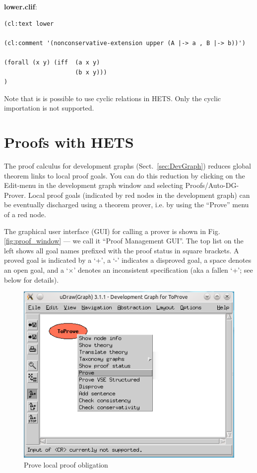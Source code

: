 \documentclass{article}
\newcommand{\normalTEXTSC}[2]{{#1\scriptsize#2}}
\newcommand     {\Hets}{\normalTEXTSC{H}{ETS}\xspace}
\begin{document}
\textbf{lower.clif}:
\begin{lstlisting}[language=clif]
(cl:text lower

(cl:comment '(nonconservative-extension upper (A |-> a , B |-> b))')

(forall (x y) (iff  (a x y)
                    (b x y)))
)
\end{lstlisting}

Note that is is possible to use cyclic relations in \Hets. Only the cyclic 
importation is not supported.



\section{Proofs with \Hets}\label{sec:Proofs}

The proof calculus for development graphs (Sect.~\ref{sec:DevGraph}) reduces
global theorem links to local proof goals. You can do this reduction by clicking 
on the Edit-menu in the development graph window and selecting 
Proofs/Auto-DG-Prover. Local proof goals (indicated by red
nodes in the development graph) can be eventually discharged using a theorem
prover, i.e. by using the ``Prove'' menu of a red node.

The graphical user interface (GUI) for calling a prover is shown in
Fig. \ref{fig:proof_window} --- we call it ``Proof Management GUI''.
The top list on the left shows all goal names prefixed with the proof
status in square brackets. A proved goal is indicated by a `+', a `-'
indicates a disproved goal, a space denotes an open goal, and a
`$\times$' denotes an inconsistent specification (aka a fallen `+';
see below for details).

\begin{figure}[ht]
  \centering
  \includegraphics[width=0.5\linewidth,keepaspectratio=true]{UserGuideCL_Prove_devGraph}
  \caption{Prove local proof obligation\label{fig:Prove_devGraph}}
\end{figure}
\end{document}
